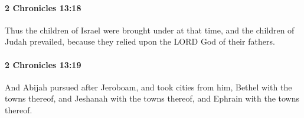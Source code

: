 		\paragraph{2 Chronicles 13:18} %
			\label{2CHRONICLES-13-18}

			Thus the children of Israel were brought under at that time, and the children of Judah prevailed, because they relied upon the LORD God of their fathers.


		\paragraph{2 Chronicles 13:19} %
			\label{2CHRONICLES-13-19}

			And Abijah pursued after Jeroboam, and took cities from him, Bethel with the towns thereof, and Jeshanah with the towns thereof, and Ephrain with the towns thereof.


